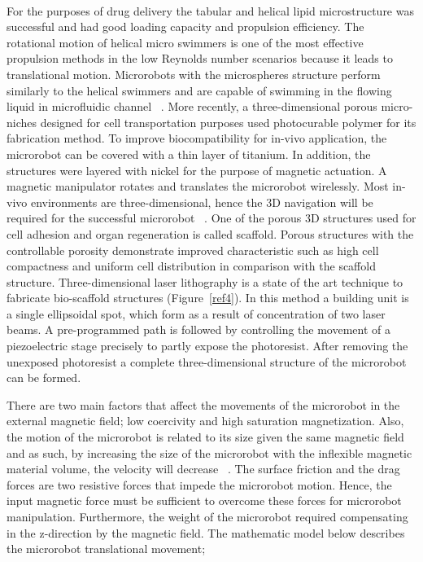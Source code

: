\documentclass[a4paper,11pt]{article}
\begin{document}
\begin{sloppypar}
\paragraph{}
 For the purposes of drug delivery the tabular and helical lipid microstructure was successful
 and had good loading capacity and propulsion efficiency. The rotational motion of helical micro
 swimmers is one of the most effective propulsion methods in the low Reynolds number scenarios 
because it leads to translational motion. Microrobots with the microspheres structure perform similarly 
to the helical swimmers and are capable of swimming in the flowing liquid in microfluidic channel ~\citep{kim2013fabrication}. 
More recently, a three-dimensional porous micro-niches designed for cell transportation purposes used
 photocurable polymer for its fabrication method. To improve biocompatibility for in-vivo application, the 
microrobot can be covered with a thin layer of titanium. In addition, the structures were layered with 
nickel for the purpose of magnetic actuation. A magnetic manipulator rotates and translates the 
microrobot wirelessly. Most in-vivo environments are three-dimensional, hence the 3D navigation will be 
required for the successful microrobot ~\citep{kim2013fabrication}.
One of the porous 3D structures used for cell adhesion and organ regeneration is called scaffold. 
Porous structures with the controllable porosity demonstrate improved characteristic such as high cell 
compactness and uniform cell distribution in comparison with the scaffold structure. Three-dimensional 
laser lithography is a state of the art technique to fabricate bio-scaffold structures (Figure~\ref{ref4}). In this method a building unit is a 
single ellipsoidal spot, which form as a result of concentration of two laser beams. A pre-programmed path 
is followed by controlling the movement of a piezoelectric stage precisely to partly expose the photoresist.
 After removing the unexposed photoresist a complete three-dimensional structure of the microrobot can 
be formed.   

There are two main factors that affect the movements of the microrobot in the external magnetic
 field; low coercivity and high saturation magnetization. Also, the motion of the microrobot is related to 
its size given the same magnetic field and as such, by increasing the size of the microrobot with the inflexible magnetic material
 volume, the velocity will decrease ~\citep{kim2013fabrication}. 
The surface friction and the drag forces are two resistive forces that impede the microrobot 
motion. Hence, the input magnetic force must be sufficient to overcome these forces for microrobot 
manipulation. Furthermore, the weight of the microrobot required compensating in the z-direction by 
the magnetic field. The mathematic model below describes the microrobot translational movement;


\end{sloppypar}
\end{document}
